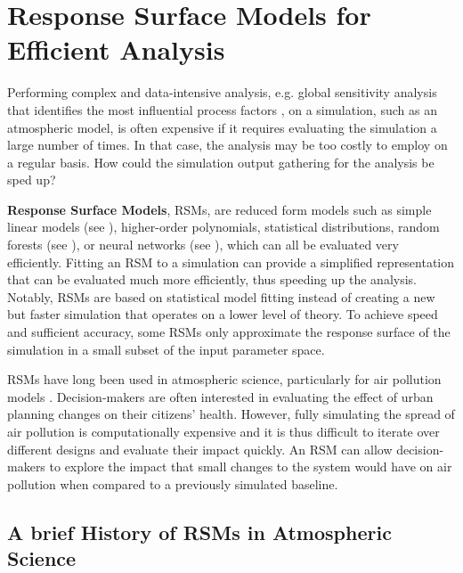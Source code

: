 \section{Response Surface Models for Efficient Analysis} \label{txt:response-surface-models}

Performing complex and data-intensive analysis, e.g. global sensitivity analysis that identifies the most influential process factors \cite{global-sensitivity-2015}, on a simulation, such as an atmospheric model, is often expensive if it requires evaluating the simulation a large number of times. In that case, the analysis may be too costly to employ on a regular basis. How could the simulation output gathering for the analysis be sped up?

\textbf{Response Surface Models}, RSMs, are reduced form models \cite{emission-rsm-2022} such as simple linear models (see ), higher-order polynomials, statistical distributions, random forests (see ), or neural networks (see ), which can all be evaluated very efficiently. Fitting an RSM to a simulation can provide a simplified representation that can be evaluated much more efficiently, thus speeding up the analysis. Notably, RSMs are based on statistical model fitting instead of creating a new but faster simulation that operates on a lower level of theory. To achieve speed and sufficient accuracy, some RSMs only approximate the response surface of the simulation in a small subset of the input parameter space.

RSMs have long been used in atmospheric science, particularly for air pollution models \cite{emission-rsm-2022}. Decision-makers are often interested in evaluating the effect of urban planning changes on their citizens' health. However, fully simulating the spread of air pollution is computationally expensive and it is thus difficult to iterate over different designs and evaluate their impact quickly. An RSM can allow decision-makers to explore the impact that small changes to the system would have on air pollution when compared to a previously simulated baseline.

\subsection{A brief History of RSMs in Atmospheric Science} \label{txt:rsm-history}

